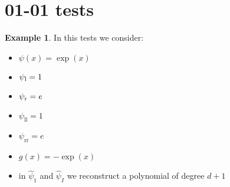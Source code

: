 \documentclass[11pt,a4paper]{article}
\author{}
\title{}
\theoremstyle{plain}
\theoremstyle{definition}
\newtheorem{exmp}[thm]{Example} %
\begin{document}
\section{01-01 tests}

\begin{exmp}
\label{Example:PRO:bending:01_01_glob5}
In this tests we consider:
\begin{itemize}
\item $\psi(x)=\exp(x)$
\item $\psi_\text l=1$
\item $\psi_\text r=e$
\item $\psi_\text{ll}=1$
\item $\psi_\text{rr}=e$
\item $g(x)=-\exp(x)$
\item in $\widehat \psi_1$ and $\widehat \psi_I$ we reconstruct a polynomial of degree $d+1$
\end{itemize}
\end{exmp}
%

\end{document}
